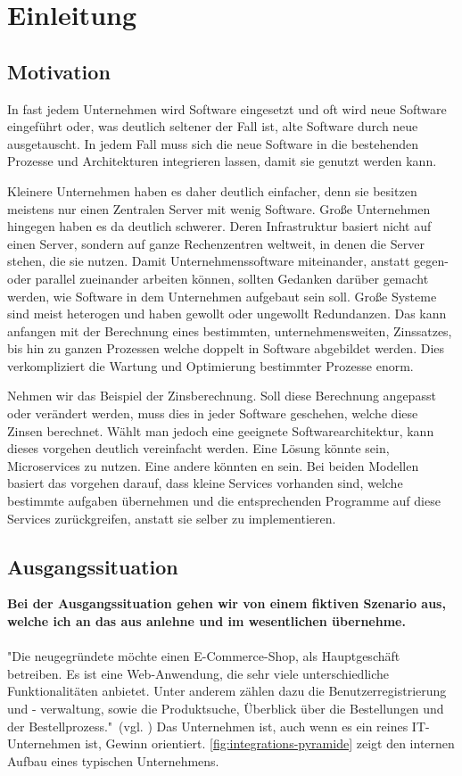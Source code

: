 \chapter{Einleitung}
\label{chap:einleitung}

\section{Motivation}
\label{sec:motivation}
In fast jedem Unternehmen wird Software eingesetzt und oft wird neue Software eingeführt oder, was deutlich seltener der Fall ist, alte Software durch neue ausgetauscht. In jedem Fall muss sich die neue Software in die bestehenden Prozesse und Architekturen integrieren lassen, damit sie genutzt werden kann.

Kleinere Unternehmen haben es daher deutlich einfacher, denn sie besitzen meistens nur einen Zentralen Server mit wenig Software. Große Unternehmen hingegen haben es da deutlich schwerer. Deren Infrastruktur basiert nicht auf einen Server, sondern auf ganze Rechenzentren weltweit, in denen die Server stehen, die sie nutzen. Damit Unternehmenssoftware miteinander, anstatt gegen- oder parallel zueinander arbeiten können, sollten Gedanken darüber gemacht werden, wie Software in dem Unternehmen aufgebaut sein soll. Große Systeme sind meist heterogen und haben gewollt oder ungewollt Redundanzen. Das kann anfangen mit der Berechnung eines bestimmten, unternehmensweiten, Zinssatzes, bis hin zu ganzen Prozessen welche doppelt in Software abgebildet werden. Dies verkompliziert die Wartung und Optimierung bestimmter Prozesse enorm.

Nehmen wir das Beispiel der Zinsberechnung. Soll diese Berechnung angepasst oder verändert werden, muss dies in jeder Software geschehen, welche diese Zinsen berechnet. Wählt man jedoch eine geeignete Softwarearchitektur, kann dieses vorgehen deutlich vereinfacht werden. Eine Lösung könnte sein, Microservices zu nutzen. Eine andere könnten \SOA en sein. Bei beiden Modellen basiert das vorgehen darauf, dass kleine Services vorhanden sind, welche bestimmte aufgaben übernehmen und die entsprechenden Programme auf diese Services zurückgreifen, anstatt sie selber zu implementieren.

\section{Ausgangssituation}
\label{sec:ausgangssituation}
\textbf{Bei der Ausgangssituation gehen wir von einem fiktiven Szenario aus, welche ich an das aus \cite[S. 15]{EWolff2016:Microservices} anlehne und im wesentlichen übernehme.}
\\\\ 
"Die neugegründete \textit{\gmbh} möchte einen E-Commerce-Shop, als Hauptgeschäft betreiben. Es ist eine Web-Anwendung, die sehr viele unterschiedliche Funktionalitäten anbietet. Unter anderem zählen dazu die Benutzerregistrierung und - verwaltung, sowie die Produktsuche, Überblick über die Bestellungen und der Bestellprozess."\ (vgl. \cite[S. 15]{EWolff2016:Microservices})
Das Unternehmen ist, auch wenn es ein reines IT-Unternehmen ist, Gewinn orientiert. \ref{fig:integrations-pyramide} zeigt den internen Aufbau eines typischen Unternehmens.

